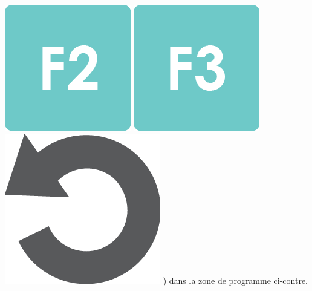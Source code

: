 \documentclass[a4paper]{article}
\begin{document}
\begin{minipage}{6cm}
\includegraphics[height=\baselineskip]{f2} 
\includegraphics[height=\baselineskip]{f3}
\includegraphics[height=\baselineskip]{rewind}
) dans la zone de programme ci-contre.


\end{minipage}
\end{document}
